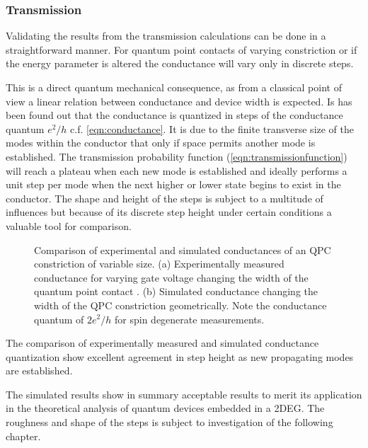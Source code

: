 \subsubsection{Transmission}
Validating the results from the transmission calculations can be done in a straightforward manner. For quantum point contacts of varying constriction or if the energy parameter is altered the conductance will vary only in discrete steps.\par
This is a direct quantum mechanical consequence, as from a classical point of view a linear relation between conductance and device width is expected.
Is has been found out that the conductance is quantized in steps of the conductance quantum $e^2/h$ c.f. \cref{eqn:conductance}.
It is due to the finite transverse size of the modes within the conductor that only if space permits another mode is established. The transmission probability function (\cref{eqn:transmissionfunction}) will reach a plateau when each new mode is established and ideally performs a unit step per mode when the next higher or lower state begins to exist in the conductor. The shape and height of the steps is subject to a multitude of influences but because of its discrete step height under certain conditions a valuable tool for comparison.\par
\begin{figure}[h]
  \begin{center}
    \caption{Comparison of experimental and simulated conductances of an QPC constriction of variable size. (a) Experimentally measured conductance for varying gate voltage changing the width of the quantum point contact \cite{PhysRevLett.60.848}. (b) Simulated conductance changing the width of the QPC constriction geometrically. Note the conductance quantum of $2e^2/h$ for spin degenerate measurements.}
\end{center}
\end{figure}
The comparison of experimentally measured and simulated conductance quantization show excellent agreement in step height as new propagating modes are established.\par
The simulated results show in summary acceptable results to merit its application in the theoretical analysis of quantum devices embedded in a 2DEG.
The roughness and shape of the steps is subject to investigation of the following chapter.\par
\FloatBarrier
